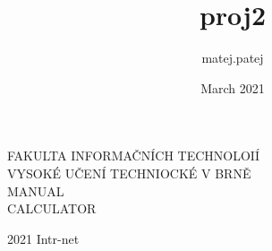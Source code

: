 \documentclass[11pt, a4paper, twocolumn ]{article}
\title{proj2}
\author{matej.patej }
\date{March 2021}
\theoremstyle{definition}
\begin{document}
\begin{titlepage}
    \begin{center}
        \vspace*{1cm}
            
        \huge
        \Huge F\huge AKULTA INFORMAČNÍCH TECHNOLOIÍ\\
        \hspace{0.2cm}
        \Huge V\huge YSOKÉ UČENÍ TECHNIOCKÉ V \Huge B\huge RNĚ\\
        MANUAL\\
        CALCULATOR
        
        
            
    \end{center}
    {\LARGE 2021 \hfill
Intr-net}
\end{titlepage}
\end{document}
